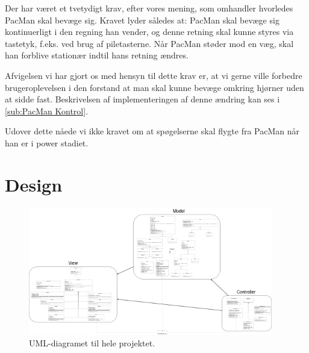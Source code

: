 \documentclass{article}
\theoremstyle{mytheoremstyle}
\theoremstyle{mytheoremstyle}
\theoremstyle{myproblemstyle}
\begin{document}
Der har været et tvetydigt krav, efter vores mening, som omhandler hvorledes
PacMan skal bevæge sig. Kravet lyder således at: PacMan skal bevæge sig
kontinuerligt i den regning han vender, og denne retning skal kunne styres via
tastetyk, f.eks. ved brug af piletasterne. Når PacMan støder mod en væg, skal
han forblive stationær indtil hans retning ændres.

Afvigelsen vi har gjort os med hensyn til dette krav er, at vi gerne ville
forbedre brugeroplevelsen i den forstand at man skal kunne bevæge omkring
hjørner uden at sidde fast. Beskrivelsen af implementeringen af denne ændring
kan ses i \autoref{sub:PacMan Kontrol}.

Udover dette nåede vi ikke kravet om at spøgelserne skal flygte fra PacMan når
han er i power stadiet.


\newpage

\section{Design}\label{sec:Design} %

\begin{figure}[H]
    \begin{center}
        \includegraphics[width=0.95\textwidth]{figures/UML-diagram.png}
    \end{center}
    \caption{UML-diagramet til hele projektet.}
    \label{UML-diagram}
\end{figure}
\end{document}
